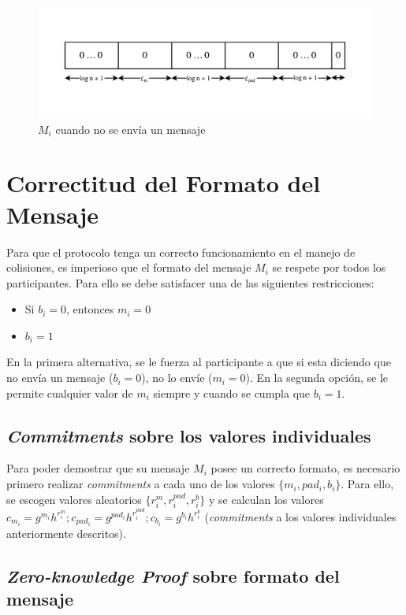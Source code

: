 \begin{figure}
  \centering
    \includegraphics[width=1\textwidth]{imagenes/message-format-nomessage.pdf}
  \caption{$M_i$ cuando no se envía un mensaje}
\end{figure}

\section{Correctitud del Formato del Mensaje}

Para que el protocolo tenga un correcto funcionamiento en el manejo de colisiones, 
es imperioso que el formato del mensaje $M_i$ se respete por todos los participantes. 
Para ello se debe satisfacer una de las siguientes restricciones:
\begin{itemize}
    \item Si $b_i = 0$, entonces $m_i = 0$
    \item $b_i = 1$
\end{itemize}
En la primera alternativa, se le fuerza al participante a que si esta diciendo que 
no envía un mensaje ($b_i = 0$), no lo envíe ($m_i = 0$). En la segunda opción, se 
le permite cualquier valor de $m_i$ siempre y cuando se cumpla que $b_i = 1$.

\subsection{\emph{Commitments} sobre los valores individuales}

Para poder demostrar que su mensaje $M_i$ posee un correcto formato, es necesario 
primero realizar \emph{commitments} a cada uno de los valores $\{m_i, pad_i, b_i\}$. 
Para ello, se escogen valores aleatorios $\{r_i^m, r_i^{pad}, r_i^b\}$ y se calculan 
los valores $c_{m_i} = g^{m_i} h^{r_i^m}; c_{pad_i} = g^{pad_i} h^{r_i^{pad}}; c_{b_i} = g^{b_i} h^{r_i^b}$ 
(\emph{commitments} a los valores individuales anteriormente descritos).

\subsection{\emph{Zero-knowledge Proof} sobre formato del mensaje}

